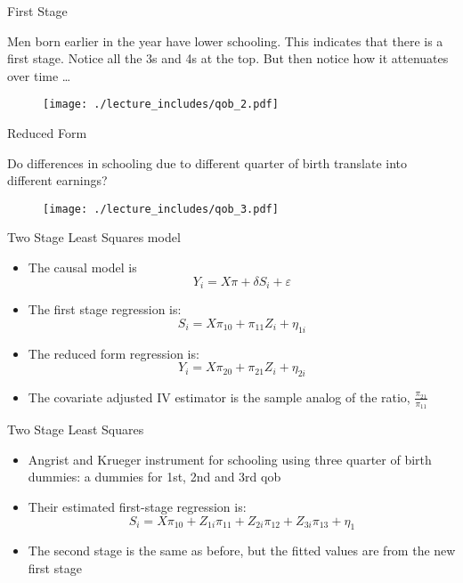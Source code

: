 \documentclass{beamer}
\begin{document}
\begin{frame}{First Stage}
	
	 Men born earlier in the year have lower schooling. This indicates that there is a first stage. Notice all the 3s and 4s at the top. But then notice how it attenuates over time \dots
	
	\begin{figure}
	\texttt{[image: ./lecture\_includes/qob\_2.pdf]}
	\end{figure}
	
\end{frame}


\begin{frame}{Reduced Form}
	
	 Do differences in schooling due to different quarter of birth translate into different earnings?
	
	\begin{figure}
	\texttt{[image: ./lecture\_includes/qob\_3.pdf]}
	\end{figure}
	
\end{frame}

\begin{frame}{Two Stage Least Squares model}
	
	\begin{itemize}
	\item The causal model is $$Y_i = X \pi + \delta S_i + \varepsilon$$
	\item The first stage regression is:$$S_i=X\pi_{10} + \pi_{11}Z_i + \eta_{1i}$$
	\item The reduced form regression is:$$Y_i=X\pi_{20} + \pi_{21}Z_i+\eta_{2i}$$
	\item The covariate adjusted IV estimator is the sample analog of the ratio, $\frac{\pi_{21}}{\pi_{11}}$
	\end{itemize}

\end{frame}

\begin{frame}{Two Stage Least Squares}
	
	\begin{itemize}
	\item Angrist and Krueger instrument for schooling using three quarter of birth dummies:  a dummies for 1st, 2nd and 3rd qob
	\item Their estimated first-stage regression is:$$S_i=X\pi_{10} + Z_{1i}\pi_{11} + Z_{2i}\pi_{12} + Z_{3i}\pi_{13}+\eta_1$$
	\item The second stage is the same as before, but the fitted values are from the new first stage
	\end{itemize}

\end{frame}
\end{document}
